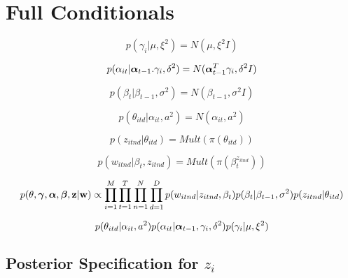 \documentclass[a4paper]{article}
\begin{document}
\newpage
\appendix

\section{Full Conditionals}

\[p(\gamma_i | \mu, \xi^2) = N(\mu, \xi^2I)\]

\[p(\alpha_{it} | \text{\boldmath$\alpha$}_{t-1}. \gamma_i, \delta^2) = N(\text{\boldmath$\alpha$}^T_{t-1} \gamma_i, \delta^2I)\]

\[p(\beta_t | \beta_{t-1}, \sigma^2) = N(\beta_{t-1}, \sigma^2I)\]

\[p(\theta_{itd} | \alpha_{it}, a^2) = N(\alpha_{it}, a^2)\] 

\[p(z_{itnd}| \theta_{itd}) = Mult(\pi(\theta_{itd}))\]

\[p(w_{itnd} | \beta_t, z_{itnd}) = Mult(\pi(\beta_t^{z_{itnd}}))\]

\[p(\theta, \text{\boldmath$\gamma$}, \text{\boldmath$\alpha$}, \text{\boldmath$\beta$}, \textbf{z} | \textbf{w}) \propto \prod_{i=1}^M \prod_{t=1}^T \prod_{n=1}^N \prod_{d=1}^D p(w_{itnd}|z_{itnd}, \beta_t) p(\beta_t | \beta_{t-1}, \sigma^2) p(z_{itnd}|\theta_{itd})\]

\[p(\theta_{itd}|\alpha_{it},a^2)p(\alpha_{it}|\text{\boldmath$\alpha$}_{t-1}, \gamma_i, \delta^2) p(\gamma_i | \mu, \xi^2)\]



\subsection{Posterior Specification for $z_i$}
\end{document}
